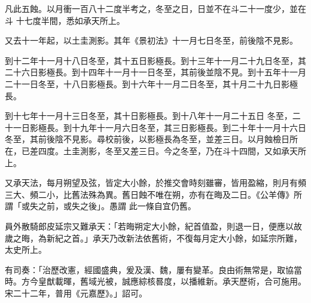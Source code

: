 \begin{pinyinscope}
 凡此五蝕。以月衝一百八十二度半考之，冬至之日，日並不在斗二十一度少，並在斗
 十七度半間，悉如承天所上。



 又去十一年起，以土圭測影。其年《景初法》十一月七日冬至，前後陰不見影。



 到十二年十一月十八日冬至，其十五日影極長。到十三年十一月二十九日冬至，其二十六日影極長。到十四年十一月十一日冬至，其前後並陰不見。到十五年十一月二十一日冬至，十八日影極長。到十六年十一月二日冬至，其十月二十九日影極長。



 到十七年十一月十三日冬至，其十日影極長。到十八年十一月二十五日
 冬至，二十一日影極長。到十九年十一月六日冬至，其三日影極長。到二十年十一月十六日冬至，其前後陰不見影。尋校前後，以影極長為冬至，並差三日。以月蝕檢日所在，已差四度。土圭測影，冬至又差三日。今之冬至，乃在斗十四間，又如承天所上。



 又承天法，每月朔望及弦，皆定大小餘，於推交會時刻雖審，皆用盈縮，則月有頻三大、頻二小，比舊法殊為異。舊日蝕不唯在朔，亦有在晦及二日。《公羊傳》所謂「或失之前，或失之後」。愚謂
 此一條自宜仍舊。



 員外散騎郎皮延宗又難承天：「若晦朔定大小餘，紀首值盈，則退一日，便應以故歲之晦，為新紀之首。」承天乃改新法依舊術，不復每月定大小餘，如延宗所難，太史所上。



 有司奏：「治歷改憲，經國盛典，爰及漢、魏，屢有變革。良由術無常是，取協當時。方今皇猷載暉，舊域光被，誠應綜核晷度，以播維新。承天歷術，合可施用。宋二十二年，普用《元嘉歷》。」詔可。



\end{pinyinscope}